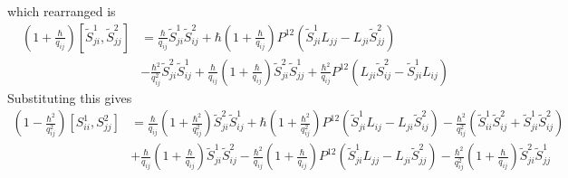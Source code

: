 \documentclass[11pt]{report}
\theoremstyle{definition}
\theoremstyle{remark}
\theoremstyle{remark}
\begin{document}
which rearranged is
\begin{align*}
(1+\frac{\hbar}{q_{ij}}) [\tilde S_{ji}^1,\tilde S_{jj}^2]
&= \frac{\hbar}{q_{ij}} \tilde S_{ji}^1 \tilde S_{ij}^2 + \hbar (1 + \frac{\hbar}{q_{ij}}) P^{12}(\tilde S_{ji}^1 L_{jj} - L_{ji} \tilde S_{jj}^2) \\
&- \frac{\hbar^2}{q_{ij}^2} \tilde S_{ji}^2 \tilde S_{ij}^1
+ \frac{\hbar}{q_{ij}} (1 + \frac{\hbar}{q_{ij}}) \tilde S_{ji}^2 \tilde S_{jj}^1
+ \frac{\hbar^2}{q_{ij}} P^{12}(L_{ji} \tilde S_{ij}^2 - \tilde S_{ji}^1 L_{ij})
\end{align*}
Substituting this gives
\begin{align*}
(1 - \frac{\hbar^2}{q_{ij}^2})[S_{ii}^1,S_{jj}^2]
&= \frac{\hbar}{q_{ij}} (1 + \frac{\hbar^2}{q_{ij}^2}) \tilde S_{ji}^2 \tilde S_{ij}^1 + \hbar (1 + \frac{\hbar^2}{q_{ij}^2}) P^{12}(\tilde S_{ji}^1 L_{ij}-L_{ji} \tilde S_{ij}^2) - \frac{\hbar^2}{q_{ij}^2} (\tilde S_{ii}^1 \tilde S_{ij}^2 + \tilde S_{ji}^1 \tilde S_{ij}^2) \\
&+ \frac{\hbar}{q_{ij}} (1 + \frac{\hbar}{q_{ij}}) \tilde S_{ji}^1 \tilde S_{ij}^2 - \frac{\hbar^2}{q_{ij}} (1 + \frac{\hbar}{q_{ij}}) P^{12}(\tilde S_{ji}^1 L_{jj} - L_{ji} \tilde S_{jj}^2) - \frac{\hbar^2}{q_{ij}^2} (1 + \frac{\hbar}{q_{ij}}) \tilde S_{ji}^2 \tilde S_{jj}^1
\end{align*}
\end{document}
